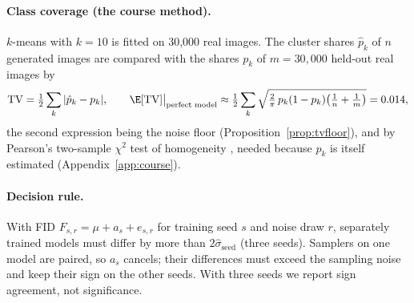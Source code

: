 \paragraph{Class coverage (the course method).} $k$-means \citep{lloyd1982kmeans} with $k=10$ is fitted on 30,000 real images. The cluster shares $\hat p_k$ of $n$ generated images are compared with the shares $p_k$ of $m=30{,}000$ held-out real images by
\begin{equation}\label{eq:tv}
\mathrm{TV}=\tfrac12\sum_k|\hat p_k-p_k|,\qquad
\E[\mathrm{TV}]\big|_{\text{perfect model}}\approx\tfrac12\sum_k\sqrt{\tfrac{2}{\pi}\,p_k(1-p_k)\big(\tfrac1n+\tfrac1m\big)}=0.014,
\end{equation}
the second expression being the noise floor (Proposition~\ref{prop:tvfloor}), and by Pearson's two-sample $\chi^2$ test of homogeneity \citep{agresti2013cda}, needed because $p_k$ is itself estimated (Appendix~\ref{app:course}).
\paragraph{Decision rule.} With FID $F_{s,r}=\mu+a_s+e_{s,r}$ for training seed $s$ and noise draw $r$, separately trained models must differ by more than $2\hat\sigma_{\text{seed}}$ (three seeds). Samplers on one model are paired, so $a_s$ cancels; their differences must exceed the sampling noise and keep their sign on the other seeds. With three seeds we report sign agreement, not significance.
